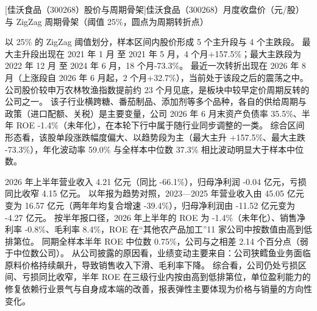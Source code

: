 \begin{center}
\begin{minipage}{\textwidth}\centering
{}

[佳沃食品（300268）股价与周期骨架]{佳沃食品（300268）月度收盘价（元/股）与 ZigZag 周期骨架（阈值 25\%，圆点为周期转折点）}
\end{minipage}
\end{center}

 以 25\% 的 ZigZag 阈值划分，样本区间内股价形成 5 个主升段与 4 个主跌段。 最大主升段出现在 2021 年 1 月 至 2021 年 5 月，4 个月+157.5\%；最大主跌段为 2022 年 12 月 至 2024 年 6 月，18 个月-73.3\%。 最近一次转折出现在 2026 年 8 月（上涨段自 2026 年 6 月起，2 个月+32.7\%），当前处于该段之后的震荡之中。 公司股价较申万农林牧渔指数提前约 23 个月见底，是板块中较早定价周期反转的公司之一。 该子行业横跨糖、番茄制品、添加剂等多个品种，各自的供给周期与政策（进口配额、关税）是主要变量，公司 2026 年 6 月末资产负债率 35.5\%、半年 ROE -1.4\%（未年化），在本轮下行中属于随行业同步调整的一类。 综合区间形态看，该股单段涨跌幅度偏大、以趋势段为主（最大主升 +157.5\%、最大主跌 -73.3\%），年化波动率 59.0\% 与全样本中位数 37.3\% 相比波动明显大于样本中位数。

 2026 年上半年营业收入 4.21 亿元（同比 -66.1\%），归母净利润 -0.04 亿元，亏损同比收窄 4.15 亿元。 以年报为趋势对照，2023---2025 年营业收入由 45.05 亿元变为 16.57 亿元（两年年均复合增速 -39.4\%），归母净利润由 -11.52 亿元变为 -4.27 亿元。 按半年报口径，2026 年上半年的 ROE 为 -1.4\%（未年化）、销售净利率 -0.8\%、毛利率 8.4\%，ROE 在“其他农产品加工”11 家公司中按数值由高到低排第位。 同期全样本半年 ROE 中位数 0.75\%，公司与之相差 2.14 个百分点（弱于中位数公司）。 从公司披露的原因看，业绩变动主要来自：公司狭鳕鱼业务面临原料价格持续飙升，导致销售收入下滑、毛利率下降。 综合看，公司仍处亏损区间、亏损同比收窄，半年 ROE 在三级行业内按由高到低排第位，单位盈利能力的修复依赖行业景气与自身成本端的改善，报表弹性主要体现为价格与销量的方向性变化。

